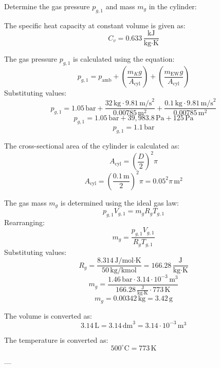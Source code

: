 Determine the gas pressure \( p_{g,1} \) and mass \( m_g \) in the cylinder:  

The specific heat capacity at constant volume is given as:  
\[
C_v = 0.633 \, \frac{\text{kJ}}{\text{kg·K}}
\]  

The gas pressure \( p_{g,1} \) is calculated using the equation:  
\[
p_{g,1} = p_{\text{amb}} + \left( \frac{m_K g}{A_{\text{cyl}}} \right) + \left( \frac{m_{\text{EW}} g}{A_{\text{cyl}}} \right)
\]  
Substituting values:  
\[
p_{g,1} = 1.05 \, \text{bar} + \frac{32 \, \text{kg} \cdot 9.81 \, \text{m/s}^2}{0.00785 \, \text{m}^2} + \frac{0.1 \, \text{kg} \cdot 9.81 \, \text{m/s}^2}{0.00785 \, \text{m}^2}
\]  
\[
p_{g,1} = 1.05 \, \text{bar} + 39,983.8 \, \text{Pa} + 125 \, \text{Pa}
\]  
\[
p_{g,1} = 1.1 \, \text{bar}
\]  

The cross-sectional area of the cylinder is calculated as:  
\[
A_{\text{cyl}} = \left( \frac{D}{2} \right)^2 \pi
\]  
\[
A_{\text{cyl}} = \left( \frac{0.1 \, \text{m}}{2} \right)^2 \pi = 0.05^2 \pi \, \text{m}^2
\]  

The gas mass \( m_g \) is determined using the ideal gas law:  
\[
p_{g,1} V_{g,1} = m_g R_g T_{g,1}
\]  
Rearranging:  
\[
m_g = \frac{p_{g,1} V_{g,1}}{R_g T_{g,1}}
\]  
Substituting values:  
\[
R_g = \frac{8.314 \, \text{J/mol·K}}{50 \, \text{kg/kmol}} = 166.28 \, \frac{\text{J}}{\text{kg·K}}
\]  
\[
m_g = \frac{1.46 \, \text{bar} \cdot 3.14 \cdot 10^{-3} \, \text{m}^3}{166.28 \, \frac{\text{J}}{\text{kg·K}} \cdot 773 \, \text{K}}
\]  
\[
m_g = 0.00342 \, \text{kg} = 3.42 \, \text{g}
\]  

The volume is converted as:  
\[
3.14 \, \text{L} = 3.14 \, \text{dm}^3 = 3.14 \cdot 10^{-3} \, \text{m}^3
\]  

The temperature is converted as:  
\[
500^\circ\text{C} = 773 \, \text{K}
\]  

---
